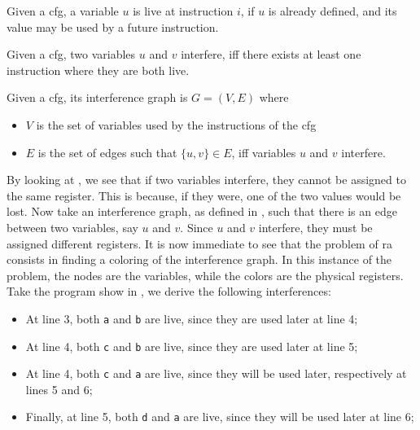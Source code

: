 \begin{definition}[Liveness]\label{def:liveness}
  Given a \gls{cfg}, a variable $u$ is live at instruction $i$, if $u$ is already defined, and its value may be used by a future instruction.
\end{definition}

\begin{definition}[Interference]
  Given a \gls{cfg}, two variables $u$ and $v$ interfere, iff there exists at least one instruction where they are both live.
\end{definition}

\begin{definition}\label{def:ig}
  Given a \gls{cfg}, its interference graph is $G = (V, E)$ where
  \begin{itemize}
  \item $V$ is the set of variables used by the instructions of the \gls{cfg}
  \item $E$ is the set of edges such that $\{ u, v \} \in E$, iff variables $u$ and $v$ interfere.
  \end{itemize}
\end{definition}

By looking at , we see that if two variables interfere, they cannot be assigned to the same register. This is because, if they were, one of the two values would be lost.
Now take an interference graph, as defined in , such that there is an edge between two variables, say $u$ and $v$. Since $u$ and $v$ interfere, they must be assigned different registers.
It is now immediate to see that the problem of \gls{ra} consists in finding a coloring of the interference graph. In this instance of the problem, the nodes are the variables, while the colors are the physical registers.
Take the program show in , we derive the following interferences:
\begin{itemize}
  \item At line 3, both \texttt a and \texttt b are live, since they are used later at line 4;
  \item At line 4, both \texttt c and \texttt b are live, since they are used later at line 5;
  \item At line 4, both \texttt c and \texttt a are live, since they will be used later, respectively at lines 5 and 6;
  \item Finally, at line 5, both \texttt d and \texttt a are live, since they will be used later at line 6;
\end{itemize}

